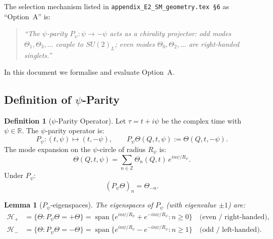 \documentclass[12pt,a4paper]{article}
\newtheorem{lemma}[theorem]{Lemma}
\theoremstyle{definition}
\newtheorem{definition}[theorem]{Definition}
\theoremstyle{remark}
\begin{document}
The selection mechanism listed in \texttt{appendix\_E2\_SM\_geometry.tex~§6}
as ``Option~A'' is:

\begin{quote}
\textit{``The $\psi$-parity $P_\psi: \psi \to -\psi$ acts as a chirality projector:
odd modes $\Theta_1, \Theta_3,\ldots$ couple to $SU(2)_L$;
even modes $\Theta_0, \Theta_2,\ldots$ are right-handed singlets.''}
\end{quote}

In this document we formalise and evaluate Option~A.

\subsection{Definition of $\psi$-Parity}
\label{subsec:psi_parity_def}

\begin{definition}[$\psi$-Parity Operator]
\label{def:psi_parity}
Let $\tau = t + i\psi$ be the complex time with $\psi\in\mathbb{R}$.
The $\psi$-parity operator is:
\begin{equation}
  P_\psi : (t,\psi) \mapsto (t,-\psi),
  \qquad
  P_\psi\Theta(Q,t,\psi) := \Theta(Q,t,-\psi).
\label{eq:psi_parity}
\end{equation}
The mode expansion on the $\psi$-circle of radius $R_\psi$ is:
\begin{equation}
  \Theta(Q,t,\psi) = \sum_{n\in\mathbb{Z}} \Theta_n(Q,t)\,e^{in\psi/R_\psi}.
\label{eq:mode_expansion}
\end{equation}
Under $P_\psi$:
\begin{equation}
  (P_\psi\Theta)_n = \Theta_{-n}.
\label{eq:parity_on_modes}
\end{equation}
\end{definition}

\begin{lemma}[$P_\psi$-eigenspaces]
\label{lem:eigenspaces}
The eigenspaces of $P_\psi$ (with eigenvalue $\pm 1$) are:
\begin{align}
  \mathcal{H}_+ &= \bigl\{\Theta : P_\psi\Theta = +\Theta\bigr\}
    = \operatorname{span}\{e^{in\psi/R_\psi} + e^{-in\psi/R_\psi} : n\geq 0\}
    \quad\text{(even / right-handed)}, \\
  \mathcal{H}_- &= \bigl\{\Theta : P_\psi\Theta = -\Theta\bigr\}
    = \operatorname{span}\{e^{in\psi/R_\psi} - e^{-in\psi/R_\psi} : n\geq 1\}
    \quad\text{(odd / left-handed)}.
\end{align}
\end{lemma}
\end{document}
